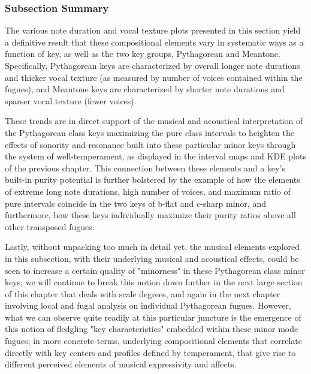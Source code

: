     \begin{center}
    \end{center}
    
    \subsubsection{Subsection Summary}\label{subsection-summary}

The various note duration and vocal texture plots presented in this
section yield a definitive result that these compositional elements vary
in systematic ways as a function of key, as well as the two key groups,
Pythagorean and Meantone. Specifically, Pythagorean keys are
characterized by overall longer note durations and thicker vocal texture
(as measured by number of voices contained within the fugues), and
Meantone keys are characterized by shorter note durations and sparser
vocal texture (fewer voices).

These trends are in direct support of the musical and acoustical
interpretation of the Pythagorean class keys maximizing the pure class
intervals to heighten the effects of sonority and resonance built into
these particular minor keys through the system of well-temperament, as
displayed in the interval maps and KDE plots of the previous chapter.
This connection between these elements and a key's built-in purity
potential is further bolstered by the example of how the elements of
extreme long note durations, high number of voices, and maximum ratio of
pure intervals coincide in the two keys of b-flat and c-sharp minor, and
furthermore, how these keys individually maximize their purity ratios
above all other transposed fugues.

Lastly, without unpacking too much in detail yet, the musical elements
explored in this subsection, with their underlying musical and
acoustical effects, could be seen to increase a certain quality of
"minorness" in these Pythagorean class minor keys; we will continue to
break this notion down further in the next large section of this chapter
that deals with scale degrees, and again in the next chapter involving
local and fugal analysis on individual Pythagorean fugues. However, what
we can observe quite readily at this particular juncture is the
emergence of this notion of fledgling "key characteristics" embedded
within these minor mode fugues; in more concrete terms, underlying
compositional elements that correlate directly with key centers and
profiles defined by temperament, that give rise to different perceived
elements of musical expressivity and affects.

